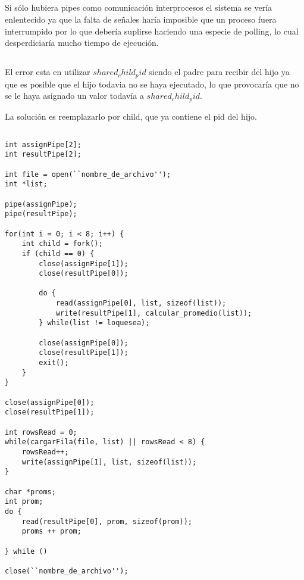\setcounter{subsection}{11}
\subsection{}

Si sólo hubiera pipes como comunicación interprocesos el sistema se vería
enlentecido ya que la falta de señales haría imposible que un proceso fuera
interrumpido por lo que debería suplirse haciendo una especie de polling, lo
cual desperdiciaría mucho tiempo de ejecución.

\setcounter{subsection}{13}
\subsection{}

El error esta en utilizar $shared_child_pid$ siendo el padre para recibir del
hijo ya que es posible que el hijo todavia no se haya ejecutado, lo que
provocaría que no se le haya asignado un valor todavía a $shared_child_pid$.

La solución es reemplazarlo por child, que ya contiene el pid del hijo.

\setcounter{subsection}{15}
\subsection{}

\begin{codesnippet}
\begin{verbatim}
int assignPipe[2];
int resultPipe[2];

int file = open(``nombre_de_archivo'');
int *list;

pipe(assignPipe);
pipe(resultPipe);

for(int i = 0; i < 8; i++) {
    int child = fork();
    if (child == 0) {
        close(assignPipe[1]);
        close(resultPipe[0]);

        do {
            read(assignPipe[0], list, sizeof(list));
            write(resultPipe[1], calcular_promedio(list));
        } while(list != loquesea);

        close(assignPipe[0]);
        close(resultPipe[1]);
        exit();
    }
}

close(assignPipe[0]);
close(resultPipe[1]);

int rowsRead = 0;
while(cargarFila(file, list) || rowsRead < 8) {
    rowsRead++;
    write(assignPipe[1], list, sizeof(list));
}

char *proms;
int prom;
do {
    read(resultPipe[0], prom, sizeof(prom));
    proms ++ prom;
    
} while ()

close(``nombre_de_archivo'');
\end{verbatim}
\end{codesnippet}
